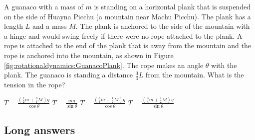 \question A guanaco with a mass of $m$ is standing on a horizontal plank that is suspended on the side of Huayna Picchu (a mountain near Machu Picchu). The plank has a length $L$ and a mass $M$. The plank is anchored to the side of the mountain with a hinge and would swing freely if there were no rope attached to the plank. A rope is attached to the end of the plank that is away from the mountain and the rope is anchored into the mountain, as shown in Figure \ref{fig:rotationaldynamics:GuanacoPlank}. The rope makes an angle $\theta$ with the plank. The guanaco is standing a distance $\frac{3}{4}L$ from the mountain. What is the tension in the rope?
\begin{checkboxes} 
\choice $T=\frac{\left( \frac{1}{2}m+ \frac{3}{4}M\right)g}{\cos\theta}$
\choice $T=\frac{mg}{\sin\theta}$
\choice $T=\frac{\left( \frac{3}{4}m+ \frac{1}{2}M\right)g}{\cos\theta}$
\CorrectChoice $T=\frac{\left( \frac{3}{4}m+ \frac{1}{2}M\right)g}{\sin\theta}$ \correct
\end{checkboxes}


%
%
\subsection{Long answers}

